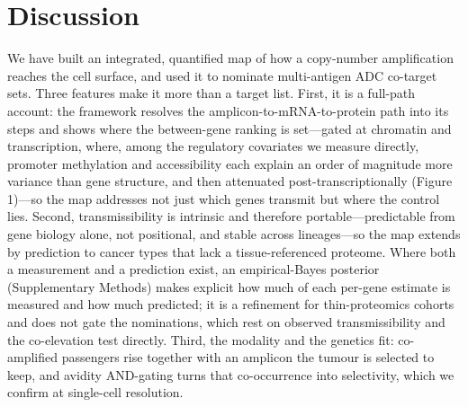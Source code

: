 \documentclass[times, twoside]{zHenriquesLab-StyleBioRxiv}
\begin{document}
\section*{Discussion}
We have built an integrated, quantified map of how a copy-number amplification reaches the cell surface, and used it to nominate multi-antigen ADC co-target sets. Three features make it more than a target list. First, it is a full-path account: the framework resolves the amplicon-to-mRNA-to-protein path into its steps and shows where the between-gene ranking is set---gated at chromatin and transcription, where, among the regulatory covariates we measure directly, promoter methylation and accessibility each explain an order of magnitude more variance than gene structure, and then attenuated post-transcriptionally (Figure 1)---so the map addresses not just which genes transmit but where the control lies. Second, transmissibility is intrinsic and therefore portable---predictable from gene biology alone, not positional, and stable across lineages---so the map extends by prediction to cancer types that lack a tissue-referenced proteome. Where both a measurement and a prediction exist, an empirical-Bayes posterior (Supplementary Methods) makes explicit how much of each per-gene estimate is measured and how much predicted; it is a refinement for thin-proteomics cohorts and does not gate the nominations, which rest on observed transmissibility and the co-elevation test directly. Third, the modality and the genetics fit: co-amplified passengers rise together with an amplicon the tumour is selected to keep, and avidity AND-gating turns that co-occurrence into selectivity, which we confirm at single-cell resolution.
\end{document}
